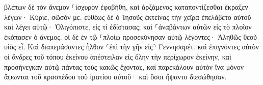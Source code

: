 \documentclass{openreader}
\begin{document}
βλέπων δὲ τὸν ἄνεμον ⸀ἰσχυρὸν ἐφοβήθη, καὶ ἀρξάμενος καταποντίζεσθαι ἔκραξεν λέγων· Κύριε, σῶσόν με. 
εὐθέως δὲ ὁ Ἰησοῦς ἐκτείνας τὴν χεῖρα ἐπελάβετο αὐτοῦ καὶ λέγει αὐτῷ· Ὀλιγόπιστε, εἰς τί ἐδίστασας; 
καὶ ⸀ἀναβάντων αὐτῶν εἰς τὸ πλοῖον ἐκόπασεν ὁ ἄνεμος. 
οἱ δὲ ἐν τῷ ⸀πλοίῳ προσεκύνησαν αὐτῷ λέγοντες· Ἀληθῶς θεοῦ υἱὸς εἶ. 
Καὶ διαπεράσαντες ἦλθον ⸂ἐπὶ τὴν γῆν εἰς⸃ Γεννησαρέτ. 
καὶ ἐπιγνόντες αὐτὸν οἱ ἄνδρες τοῦ τόπου ἐκείνου ἀπέστειλαν εἰς ὅλην τὴν περίχωρον ἐκείνην, καὶ προσήνεγκαν αὐτῷ πάντας τοὺς κακῶς ἔχοντας, 
καὶ παρεκάλουν αὐτὸν ἵνα μόνον ἅψωνται τοῦ κρασπέδου τοῦ ἱματίου αὐτοῦ· καὶ ὅσοι ἥψαντο διεσώθησαν. 
\end{document}
